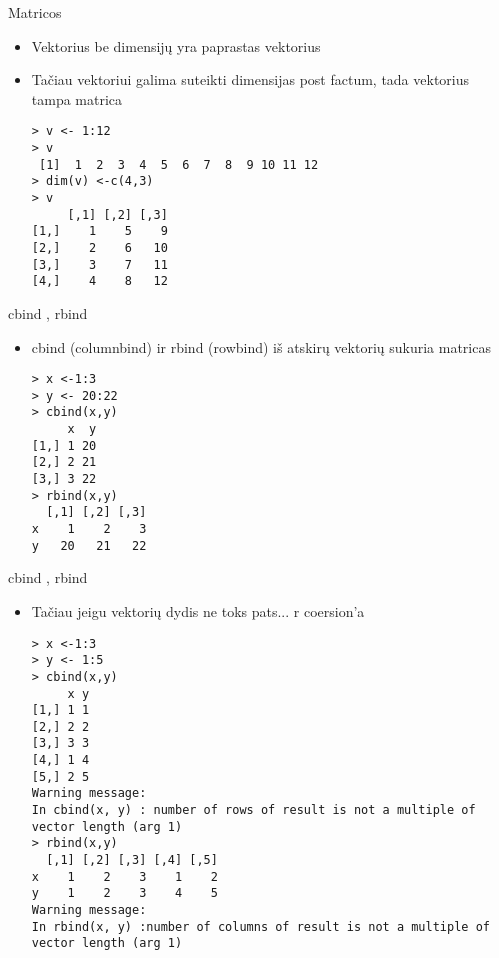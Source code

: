 \documentclass[11pt,xcolor=table]{beamer}
\begin{document}

\begin{frame}[fragile]{Matricos}
\begin{itemize}
\item Vektorius be dimensijų yra paprastas vektorius
\item Tačiau vektoriui galima suteikti dimensijas post factum, tada vektorius tampa matrica
\begin{lstlisting}
> v <- 1:12
> v
 [1]  1  2  3  4  5  6  7  8  9 10 11 12
> dim(v) <-c(4,3)
> v
     [,1] [,2] [,3]
[1,]    1    5    9
[2,]    2    6   10
[3,]    3    7   11
[4,]    4    8   12
\end{lstlisting}
\end{itemize}
\end{frame}


\begin{frame}[fragile]{cbind , rbind}
\begin{itemize}
\item cbind (columnbind) ir rbind (rowbind) iš atskirų vektorių sukuria matricas
\begin{lstlisting}
> x <-1:3
> y <- 20:22
> cbind(x,y)
     x  y
[1,] 1 20
[2,] 2 21
[3,] 3 22
> rbind(x,y)
  [,1] [,2] [,3]
x    1    2    3
y   20   21   22
\end{lstlisting}
\end{itemize}
\end{frame}


\begin{frame}[fragile]{cbind , rbind}
\begin{itemize}
\item Tačiau jeigu vektorių dydis ne toks pats... r coersion'a 
\begin{lstlisting}
> x <-1:3
> y <- 1:5
> cbind(x,y)
     x y
[1,] 1 1
[2,] 2 2
[3,] 3 3
[4,] 1 4
[5,] 2 5
Warning message:
In cbind(x, y) : number of rows of result is not a multiple of vector length (arg 1)
> rbind(x,y)
  [,1] [,2] [,3] [,4] [,5]
x    1    2    3    1    2
y    1    2    3    4    5
Warning message:
In rbind(x, y) :number of columns of result is not a multiple of vector length (arg 1)
\end{lstlisting}
\end{itemize}
\end{frame}
\end{document}
